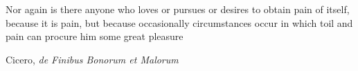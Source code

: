 \thispagestyle{empty}

\vspace*{\fill}

\epigraph{Nor again is there anyone who loves or pursues or desires to obtain pain of itself, because it is pain, but because occasionally circumstances occur in which toil and pain can procure him some great pleasure}{Cicero, \textit{de Finibus Bonorum et Malorum}}

\vspace*{\fill}